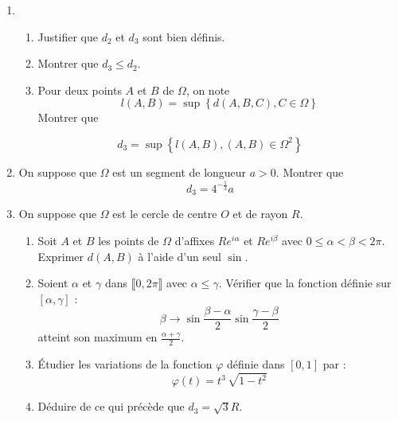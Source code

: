 \begin{enumerate}
\item \begin{enumerate}
 \item Justifier que $d_2$ et $d_3$ sont bien définis.
\item Montrer que $d_3\leq d_2$.
\item Pour deux points $A$ et $B$ de $\Omega$, on note 
\begin{displaymath}
l(A,B)= \sup \left\lbrace d(A,B,C), C\in \Omega \right\rbrace 
\end{displaymath}
Montrer que 
\end{enumerate}
\begin{displaymath}
d_3 = \sup \left\lbrace l(A,B), (A,B)\in \Omega^2 \right\rbrace 
\end{displaymath}

 \item On suppose que $\Omega$ est un segment de longueur $a>0$. Montrer que 
\begin{displaymath}
 d_3=4^{-\frac{1}{3}}a
\end{displaymath}


\item On suppose que $\Omega$ est le cercle de centre $O$ et de rayon $R$.
\begin{enumerate}
 \item Soit $A$ et $B$ les points de $\Omega$ d'affixes $Re^{i\alpha}$ et $Re^{i\beta}$ avec $0\leq \alpha < \beta <2\pi$. Exprimer $d(A,B)$ à l'aide d'un seul $\sin$.
\item  Soient $\alpha$ et $\gamma$ dans $\llbracket 0,2\pi \rrbracket$ avec $\alpha \leq \gamma$. Vérifier que la fonction définie sur $[\alpha , \gamma]$ :
\begin{displaymath}
 \beta \rightarrow \sin \frac{\beta -\alpha}{2} \sin \frac{\gamma -\beta}{2}
\end{displaymath}
atteint son maximum en $\frac{\alpha + \gamma}{2}$.
\item \'{E}tudier les variations de la fonction $\varphi$ définie dans $[0,1]$ par : 
\begin{displaymath}
 \varphi (t) = t^3 \, \sqrt{1-t^2}
\end{displaymath}
\item Déduire de ce qui précède que $d_3 = \sqrt{3}R$.

\end{enumerate}
\end{enumerate}

